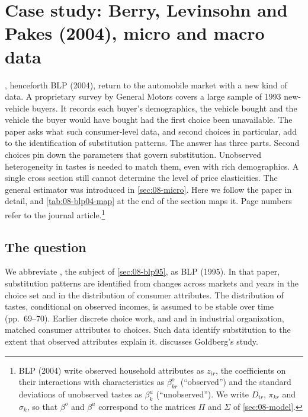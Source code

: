 \section{Case study: Berry, Levinsohn and Pakes (2004), micro and macro data}\label{sec:08-blp04}

\citet{BerryLevinsohnPakes2004}, henceforth BLP (2004), return to the automobile market with a new kind of
data. A proprietary survey by General Motors covers a large sample of 1993 new-vehicle buyers. It records
each buyer's demographics, the vehicle bought and the vehicle the buyer would have bought had the first choice
been unavailable. The paper asks what such consumer-level data, and second choices in particular, add to the
identification of substitution patterns. The answer has three parts. Second choices pin down the parameters
that govern substitution. Unobserved heterogeneity in tastes is needed to match them, even with rich
demographics. A single cross section still cannot determine the level of price elasticities. The general
estimator was introduced in \cref{sec:08-micro}. Here we follow the paper in detail, and
\cref{tab:08-blp04-map} at the end of the section maps it. Page numbers refer to the
journal article.\footnote{BLP (2004) write observed household attributes as $z_{ir}$, the coefficients on
their interactions with characteristics as $\beta^{o}_{kr}$ (``observed'') and the standard deviations of
unobserved tastes as $\beta^{u}_k$ (``unobserved''). We write $D_{ir}$, $\pi_{kr}$ and $\sigma_k$, so that
$\beta^{o}$ and $\beta^{u}$ correspond to the matrices $\Pi$ and $\Sigma$ of \cref{sec:08-model}.}

\subsection{The question}\label{sec:08-blp04-question}

We abbreviate \citet{BerryLevinsohnPakes1995}, the subject of \cref{sec:08-blp95}, as BLP (1995). In that
paper, substitution patterns are identified from changes across markets and years in the choice set and in the
distribution of consumer attributes. The distribution of tastes,
conditional on observed incomes, is assumed to be stable over time (pp.~69--70). Earlier discrete choice work,
and \citet{Goldberg1995} and \citet{Petrin2002} in industrial organization, matched consumer attributes to
choices. Such data identify substitution to the extent that observed attributes explain it.
 discusses Goldberg's study.

